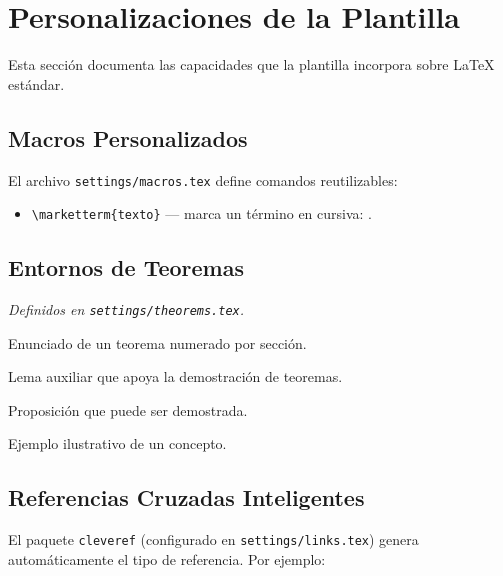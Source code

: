 \documentclass[/work/src/main.tex]{subfiles}
\begin{document}
\section{Personalizaciones de la Plantilla}
\label{sec:personalizaciones}

Esta sección documenta las capacidades que la plantilla incorpora sobre LaTeX estándar.

\subsection{Macros Personalizados}
\label{sec:macros}

El archivo \texttt{settings/macros.tex} define comandos reutilizables:

\begin{itemize}
    \item \texttt{\textbackslash marketterm\{texto\}} — marca un término en cursiva: .
\end{itemize}

\subsection{Entornos de Teoremas}
\label{sec:teoremas}

\emph{Definidos en \texttt{settings/theorems.tex}.}

\begin{theorem}
    Enunciado de un teorema numerado por sección.
\end{theorem}

\begin{lemma}
    Lema auxiliar que apoya la demostración de teoremas.
\end{lemma}

\begin{proposition}
    Proposición que puede ser demostrada.
\end{proposition}

\begin{example}
    Ejemplo ilustrativo de un concepto.
\end{example}

\subsection{Referencias Cruzadas Inteligentes}
\label{sec:cleveref}

El paquete \texttt{cleveref} (configurado en \texttt{settings/links.tex}) genera automáticamente el tipo de referencia. Por ejemplo:
\end{document}

